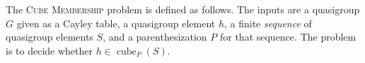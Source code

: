 \documentclass{article}
\newcommand{\gen}[1]{\langle #1 \rangle}
\DeclareMathOperator{\cube}{cube}
\DeclareMathOperator{\Path}{Path}
\begin{document}


The \textsc{Cube Membership} problem is defined as follows.
The inputs are a quasigroup $G$ given as a Cayley table, a quasigroup element $h$, a finite \emph{sequence} of quasigroup elements $S$, and a parenthesization $P$ for that sequence.
The problem is to decide whether $h \in \cube_P(S)$.
\end{document}
